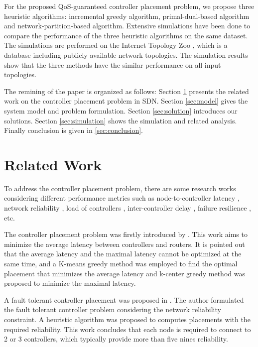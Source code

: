 \documentclass[conference]{IEEEtran}
\begin{document}
For the proposed QoS-guaranteed controller placement problem, we propose three heuristic algorithms: incremental greedy algorithm, primal-dual-based algorithm and network-partition-based algorithm. Extensive simulations have been done to compare the performance of the three heuristic algorithms on the same dataset. The simulations are performed on the Internet Topology Zoo \cite{knight2011internet}, which is a database including publicly available network topologies. The simulation results show that the three methods have the similar performance on all input topologies. 

The remining of the paper is organized as follows: Section \ref{sec:relatedwork} presents the related work on the controller placement problem in SDN. Section \ref{sec:model} gives the system model and problem formulation. Section \ref{sec:solution} introduces our solutions. Section \ref{sec:simulation} shows the simulation and related analysis. Finally conclusion is given in \ref{sec:conclusion}.

\section{Related Work}
\label{sec:relatedwork}

To address the controller placement problem, there are some research works considering different performance metrics such as node-to-controller latency \cite{heller2012controller}, network reliability \cite{ros2014five}, load of controllers \cite{yao2014capacitated}, inter-controller delay \cite{jimenez2014controller}, failure resilience \cite{hock2013pareto}, etc.

The controller placement problem was firstly introduced by \cite{heller2012controller}. This work aims to minimize the average latency between controllers and routers. It is pointed out that the average latency and the maximal latency cannot be optimized at the same time, and a K-means greedy method was employed to find the optimal placement that minimizes the average latency and k-center greedy method was proposed to minimize the maximal latency. 

A fault tolerant controller placement was proposed in \cite{ros2014five}. The author formulated the fault tolerant controller problem considering the network reliability constraint. A heuristic algorithm was proposed to computes placements with the required reliability. This work concludes that each node is required to connect to 2 or 3 controllers, which typically provide more than five nines reliability.
\end{document}
